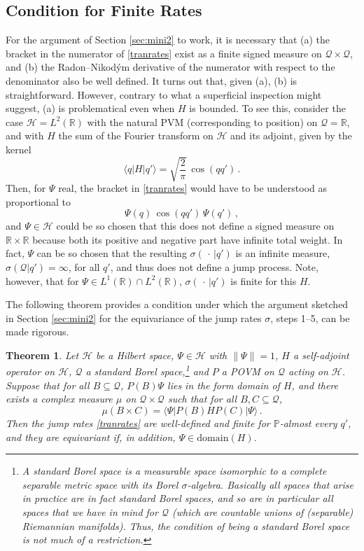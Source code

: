 \documentclass[12pt]{article}
\newcommand{\RRR}{\mathbb{R}} %
\newcommand{\1}{\mathbf{1}} %
\newcommand{\Hilbert}{\mathscr{H}}
\renewcommand{\sp}[2]{\langle #1 | #2 \rangle} %
\newcommand{\conf}{\mathcal{Q}} %
\newcommand{\measure}{\mathbb{P}} %
\newcommand{\pov}{{P}}%
\newtheorem{theorem}{Theorem}
\begin{document}
\subsection{Condition for Finite Rates}\label{sec:thm}

For the argument of Section \ref{sec:mini2} to work, it is
necessary that (a) the bracket in the numerator of \eqref{tranrates}
exist  as a finite signed measure on $\conf \times \conf$, and (b) the
Radon--Nikod\'ym derivative of the numerator with respect to the
denominator  also be  well defined. It turns out that, given (a), (b) is
straightforward. However, contrary to what a superficial inspection
might suggest, (a) is problematical even when $H$ is bounded. To see
this, consider the case $\Hilbert = L^2(\RRR)$ with the natural PVM
(corresponding to position) on $\conf = \RRR$, and with $H$ the sum of
the Fourier transform on $\Hilbert$ and its adjoint, given by the
kernel
\[
   \sp{q}{H|q'} = \sqrt{\frac{2}{\pi}} \, \cos(qq')\,.
\]
Then, for $\Psi$ real, the bracket in \eqref{tranrates} would have to
be understood as proportional to
\[
   \Psi(q) \, \cos(qq') \, \Psi(q')\,,
\]
and $\Psi \in \Hilbert$ could be so chosen that this does not define a
signed measure on $\RRR \times \RRR$ because both its positive and
negative part have infinite total weight. In fact, $\Psi$ can be so
chosen that the resulting $\sigma(\,\cdot\,|q')$ is an infinite
measure, $\sigma(\conf|q') = \infty$, for all $q'$, and thus does not
define a jump process. Note, however, that for $\Psi \in L^1(\RRR)
\cap L^2(\RRR)$, $\sigma(\,\cdot\,|q')$ is finite for this $H$.

The following theorem provides a condition under which the argument
sketched in Section \ref{sec:mini2} for the equivariance of the jump
rates $\sigma$, steps 1--5, can be made rigorous.

\begin{theorem}\label{sta:finiterates}
   Let $\Hilbert$ be a Hilbert space, $\Psi\in \Hilbert$ with
   $\|\Psi\|=1$, $H$ a self-adjoint operator on $\Hilbert$, $\conf$ a
   standard Borel space,\footnote{A \emph{standard Borel space} is a
   measurable space isomorphic to a complete separable metric space
   with its Borel $\sigma$-algebra.  Basically all spaces that arise
   in practice are in fact standard Borel spaces, and so are in
   particular all spaces that we have in mind for $\conf$ (which are
   countable unions of (separable) Riemannian manifolds). Thus, the
   condition of being a standard Borel space is not much of a
   restriction.} and $\pov$ a POVM on $\conf$ acting on $\Hilbert$.
   Suppose that for all $B \subseteq \conf$, $\pov(B) \Psi$ lies in
   the form domain of $H$, and there exists a complex measure $\mu$ on
   $\conf \times \conf$ such that for all $B,C \subseteq \conf$,
   \begin{equation}\label{muPsiPH}
     \mu(B \times C) = \sp{\Psi}{\pov(B) H \pov(C)| \Psi}\,.
   \end{equation}
   Then the jump rates \eqref{tranrates} are well-defined and finite
   for $\measure$-almost every $q'$, and they are equivariant if, in
   addition, $\Psi \in \mathrm{domain}(H)$.
\end{theorem}
\end{document}
